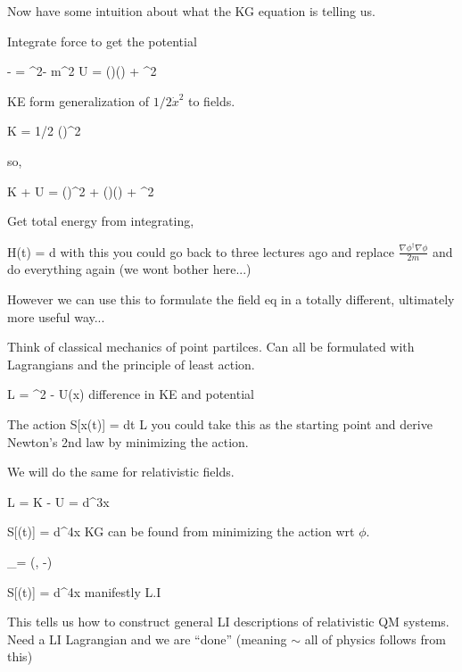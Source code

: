 {Now have some intuition about what the KG equation is telling us.

Integrate force to get the potential

\be
- = \nabla^2\phi - m^2 \phi \Rightarrow U = (\nabla \phi)(\nabla \phi) + \phi^2
\ee

KE form generalization of $1/2 \dot{x}^2$ to fields.

\be
K = 1/2 (\phi)^2
\ee

so,

\be
K + U  =  (\phi)^2 + (\nabla \phi)(\nabla \phi) + \phi^2
\ee

Get total energy from integrating, 

\be
H(t) = \int d 
\ee
with this you could go back to three lectures ago and replace $\frac{\nabla\phi^\dagger\nabla\phi}{2m}$ and do everything again (we wont bother here...)


However we can use this to formulate the field eq in a totally different, ultimately more useful way...


Think of classical mechanics of point partilces.
Can all be formulated with Lagrangians and the principle of least action. 


\be
L = ^2 - U(x)
\ee 
difference in KE and potential

The action
\be
S[x(t)] = \int dt L
\ee
you could take this as the starting point and derive Newton's 2nd law by minimizing the action.

We will do the same for relativistic fields.

\be
L = K - U = \int d^3x 
\ee



\be
S[\phi(t)] = \int d^4x 
\ee
KG can be found from minimizing the action wrt $\phi$.


\be
\partial_\mu = (, -\vec{\nabla})
\ee

\be
S[\phi(t)] = \int d^4x 
\ee
manifestly L.I


This tells us how to construct general LI descriptions of relativistic QM systems.
Need a LI Lagrangian and we are ``done'' (meaning $\sim$ all of physics follows from this) 

}
